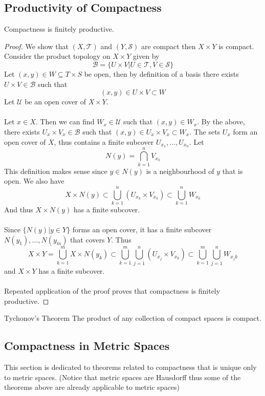 \documentclass[a4paper]{article}
\begin{document}
\subsection{Productivity of Compactness}
\begin{prp}{}{} Compactness is finitely productive. \tcbline
\begin{proof}
We show that $(X,\mathcal{T})$ and $(Y,\mathcal{S})$ are compact then $X\times Y$ is compact. Consider the product topology on $X\times Y$ given by $$\mathcal{B}=\{U\times V|U\in\mathcal{T},V\in\mathcal{S}\}$$ Let $(x,y)\in W\subseteq T\times S$ be open, then by definition of a basis there exists $U\times V\in\mathcal{B}$ such that $$(x,y)\in U\times V\subset W$$ Let $\mathcal{U}$ be an open cover of $X\times Y$. \\~\\
Let $x\in X$. Then we can find $W_x\in\mathcal{U}$ such that $(x,y)\in W_x$. By the above, there exists $U_x\times V_x\in\mathcal{B}$ such that $(x,y)\in U_x\times V_x\subset W_x$. The sets $U_x$ form an open cover of $X$, thus contains a finite subcover $U_{x_1},\dots,U_{x_n}$. Let $$N(y)=\bigcap_{k=1}^nV_{x_k}$$ This definition makes sense since $y\in N(y)$ is a neighbourhood of $y$ that is open. We also have $$X\times N(y)\subset\bigcup_{k=1}^n(U_{x_k}\times V_{x_k})\subset\bigcup_{k=1}^nW_{x_k}$$ And thus $X\times N(y)$ has a finite subcover. \\~\\
Since $\{N(y)|y\in Y\}$ forms an open cover, it has a finite subcover $N(y_1),\dots,N(y_m)$ that covers $Y$. Thus $$X\times Y=\bigcup_{k=1}^mX\times N(y_k)\subset\bigcup_{k=1}^m\bigcup_{j=1}^n(U_{x_j}\times V_{x_k})\subset\bigcup_{k=1}^m\bigcup_{j=1}^nW_{x_jk}$$ and $X\times Y$ has a finite subcover. \\~\\
Repeated application of the proof proves that compactness is finitely productive. 
\end{proof}
\end{prp}

\begin{thm}{Tychonov's Theorem}{} The product of any collection of compact spaces is compact. 
\end{thm}

\subsection{Compactness in Metric Spaces}
This section is dedicated to theorems related to compactness that is unique only to metric spaces. (Notice that metric spaces are Hausdorff thus some of the theorems above are already applicable to metric spaces)
\end{document}
